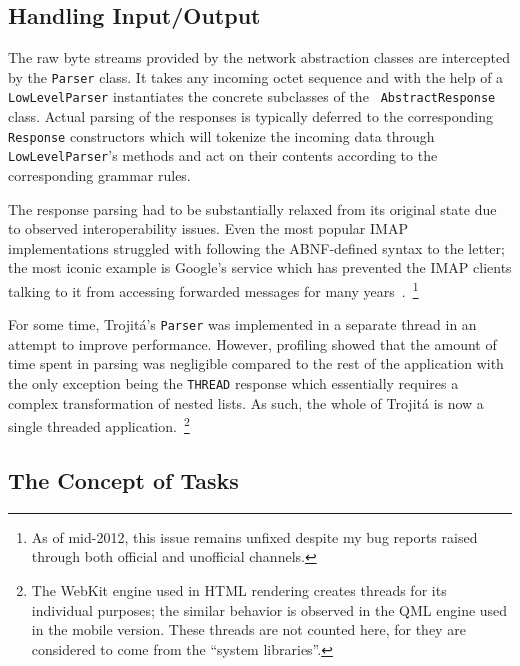 \documentclass[trojita]{subfiles}
\begin{document}
\subsection{Handling Input/Output}

The raw byte streams provided by the network abstraction classes are intercepted by the {\tt Parser} class.  It takes
any incoming octet sequence and with the help of a {\tt LowLevelParser} instantiates the concrete subclasses of the {\tt
AbstractResponse} class.  Actual parsing of the responses is typically deferred to the corresponding {\tt Response}
constructors which will tokenize the incoming data through {\tt LowLevelParser}'s methods and act on their contents
according to the corresponding grammar rules.

The response parsing had to be substantially relaxed from its original state due to observed interoperability issues.
Even the most popular IMAP implementations struggled with following the ABNF-defined \cite{rfc5234} syntax to the
letter; the most iconic example is Google's service which has prevented the IMAP clients talking to it from accessing
forwarded messages for many years~\cite{gmail-bodystructure-sucks}.~\footnote{As of mid-2012, this issue remains
unfixed despite my bug reports raised through both official and unofficial channels.}

For some time, Trojitá's {\tt Parser} was implemented in a separate thread in an attempt to improve performance.
However, profiling showed that the amount of time spent in parsing was negligible compared to the rest of the
application with the only exception being the {\tt THREAD} response which essentially requires a complex transformation
of nested lists.  As such, the whole of Trojitá is now a single threaded application.~\footnote{The WebKit engine used
in HTML rendering creates threads for its individual purposes; the similar behavior is observed in the QML engine used
in the mobile version.  These threads are not counted here, for they are considered to come from the ``system
libraries''.}

\subsection{The Concept of Tasks}
\end{document}
